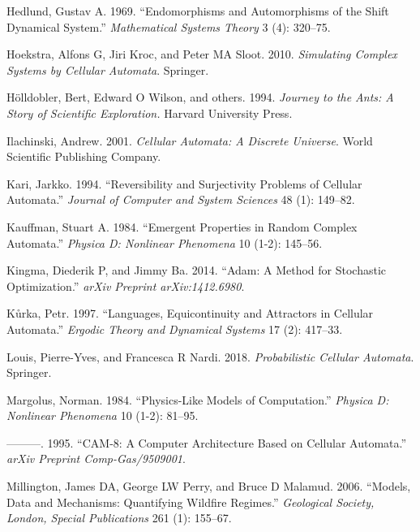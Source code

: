 \documentclass[
  openany]{book}
\newlength{\cslhangindent}
\newenvironment{cslreferences}%
  {\setlength{\parindent}{0pt}%
  \everypar{\setlength{\hangindent}{\cslhangindent}}\ignorespaces}%
  {\par}
\begin{document}
\begin{cslreferences}
\leavevmode\hypertarget{ref-hedlund1969endomorphisms}{}%
Hedlund, Gustav A. 1969. ``Endomorphisms and Automorphisms of the Shift Dynamical System.'' \emph{Mathematical Systems Theory} 3 (4): 320--75.

\leavevmode\hypertarget{ref-hoekstra2010simulating}{}%
Hoekstra, Alfons G, Jiri Kroc, and Peter MA Sloot. 2010. \emph{Simulating Complex Systems by Cellular Automata}. Springer.

\leavevmode\hypertarget{ref-holldobler1994journey}{}%
Hölldobler, Bert, Edward O Wilson, and others. 1994. \emph{Journey to the Ants: A Story of Scientific Exploration.} Harvard University Press.

\leavevmode\hypertarget{ref-ilachinski2001cellular}{}%
Ilachinski, Andrew. 2001. \emph{Cellular Automata: A Discrete Universe}. World Scientific Publishing Company.

\leavevmode\hypertarget{ref-kari1994reversibility}{}%
Kari, Jarkko. 1994. ``Reversibility and Surjectivity Problems of Cellular Automata.'' \emph{Journal of Computer and System Sciences} 48 (1): 149--82.

\leavevmode\hypertarget{ref-kauffman1984emergent}{}%
Kauffman, Stuart A. 1984. ``Emergent Properties in Random Complex Automata.'' \emph{Physica D: Nonlinear Phenomena} 10 (1-2): 145--56.

\leavevmode\hypertarget{ref-kingma2014adam}{}%
Kingma, Diederik P, and Jimmy Ba. 2014. ``Adam: A Method for Stochastic Optimization.'' \emph{arXiv Preprint arXiv:1412.6980}.

\leavevmode\hypertarget{ref-kuurka1997languages}{}%
Kůrka, Petr. 1997. ``Languages, Equicontinuity and Attractors in Cellular Automata.'' \emph{Ergodic Theory and Dynamical Systems} 17 (2): 417--33.

\leavevmode\hypertarget{ref-louis2018probabilistic}{}%
Louis, Pierre-Yves, and Francesca R Nardi. 2018. \emph{Probabilistic Cellular Automata}. Springer.

\leavevmode\hypertarget{ref-margolus1984physics}{}%
Margolus, Norman. 1984. ``Physics-Like Models of Computation.'' \emph{Physica D: Nonlinear Phenomena} 10 (1-2): 81--95.

\leavevmode\hypertarget{ref-margolus1995cam}{}%
---------. 1995. ``CAM-8: A Computer Architecture Based on Cellular Automata.'' \emph{arXiv Preprint Comp-Gas/9509001}.

\leavevmode\hypertarget{ref-millington2006models}{}%
Millington, James DA, George LW Perry, and Bruce D Malamud. 2006. ``Models, Data and Mechanisms: Quantifying Wildfire Regimes.'' \emph{Geological Society, London, Special Publications} 261 (1): 155--67.


\end{cslreferences}
\end{document}
